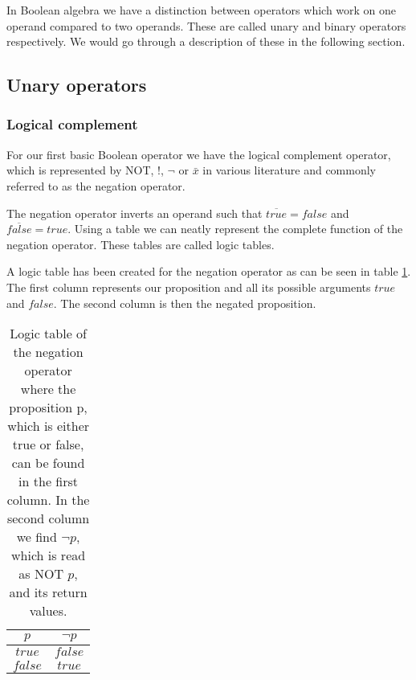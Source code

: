         In Boolean algebra we have a distinction between operators which work on one operand compared to two operands. These are called unary and binary operators respectively. We would go through a description of these in the following section. 
        
        \subsection{Unary operators}
        
            \subsubsection{Logical complement}
            
                For our first basic Boolean operator we have the logical complement operator, which is represented by NOT, !, $\neg$ or $\bar{x}$ in various literature and commonly referred to as the negation operator. 
                
                The negation operator inverts an operand such that $\overline{true} = false$ and $\overline{false} = true$.
                Using a table we can neatly represent the complete function of the negation operator. These tables are called logic tables.
                
                A logic table has been created for the negation operator as can be seen in table \ref{LogicTable:Negation}.  The first column represents our proposition and all its possible arguments $true$ and $false$. The second column is then the negated proposition.
                
                \begin{table}[h!]
                    \centering
                    \begin{tabular}{|c|c|}
                    	\hline
                    	  $p$   & $\neg{p}$ \\ \hline
                    	$true$  &  $false$  \\ \hline
                    	$false$ &  $true$   \\ \hline
                    \end{tabular}
                    \caption{Logic table of the negation operator where the proposition p, which is either true or false, can be found in the first column. In the second column we find $\neg p$, which is read as NOT $p$, and its return values.}
                    \label{LogicTable:Negation}
                \end{table}
    
